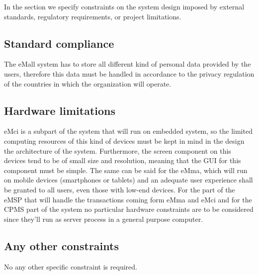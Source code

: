 In the section we specify constraints on the system design imposed by external standards, regulatory requirements, or project
limitations.

\subsection{Standard compliance}
The eMall system has to store all different kind of personal data provided by the users, therefore this data must be handled in accordance to the privacy regulation of the countries in which the organization will operate.

\subsection{Hardware limitations}
eMci is a subpart of the system that will run on embedded system, so the limited computing resources of this kind of devices must be kept in mind in the design the architecture of the system. Furthermore, the screen component on this devices tend to be of small size and resolution, meaning that the GUI for this component must be simple. The same can be said for the eMma, which will run on mobile devices (smartphones or tablets) and an adequate user experience shall be granted to all users, even those with low-end devices. For the part of the eMSP that will handle the transactions coming form eMma and eMci and for the CPMS part of the system no particular hardware constraints are to be considered since they'll run as server process in a general purpose computer.

\subsection{Any other constraints}
No any other specific constraint is required.